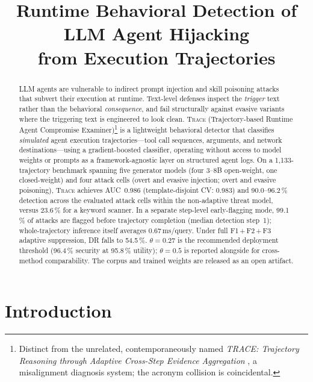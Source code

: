 \documentclass[conference]{IEEEtran}
\title{Runtime Behavioral Detection of LLM Agent Hijacking\\
from Execution Trajectories}
\begin{document}
\maketitle

\begin{abstract}
LLM agents are vulnerable to indirect prompt injection and skill
poisoning attacks that subvert their execution at runtime.
Text-level defenses inspect the \emph{trigger} text rather than the
behavioral \emph{consequence}, and fail structurally against evasive
variants where the triggering text is engineered to look clean.
\textsc{Trace} (Trajectory-based Runtime Agent Compromise
Examiner)\footnote{Distinct from the unrelated, contemporaneously
named \emph{TRACE: Trajectory Reasoning through Adaptive Cross-Step
Evidence Aggregation} \cite{mittapalli2026trace}, a misalignment
diagnosis system; the acronym collision is coincidental.} is a
lightweight behavioral detector that classifies \emph{simulated}
agent execution trajectories---tool call sequences, arguments, and
network destinations---using a gradient-boosted classifier, operating
without access to model weights or prompts as a framework-agnostic
layer on structured agent logs.
On a 1{,}133-trajectory benchmark spanning five generator models
(four 3--8B open-weight, one closed-weight) and four attack cells
(overt and evasive injection; overt and evasive poisoning),
\textsc{Trace} achieves AUC~0.986 (template-disjoint CV: 0.983) and
90.0--96.2\,\% detection across the evaluated attack cells within the
non-adaptive threat model, versus 23.6\,\% for a keyword scanner.
In a separate step-level early-flagging mode, 99.1\,\% of attacks are
flagged before trajectory completion (median detection step~1);
whole-trajectory inference itself averages 0.67\,ms/query. Under
full F1\,+\,F2\,+\,F3 adaptive suppression, DR falls to 54.5\,\%.
$\theta{=}0.27$ is the recommended deployment threshold (96.4\,\%
security at 95.8\,\% utility); $\theta{=}0.5$ is reported alongside
for cross-method comparability. The corpus and trained weights are
released as an open artifact.
\end{abstract}

\section{Introduction}
\label{sec:intro}
\end{document}
